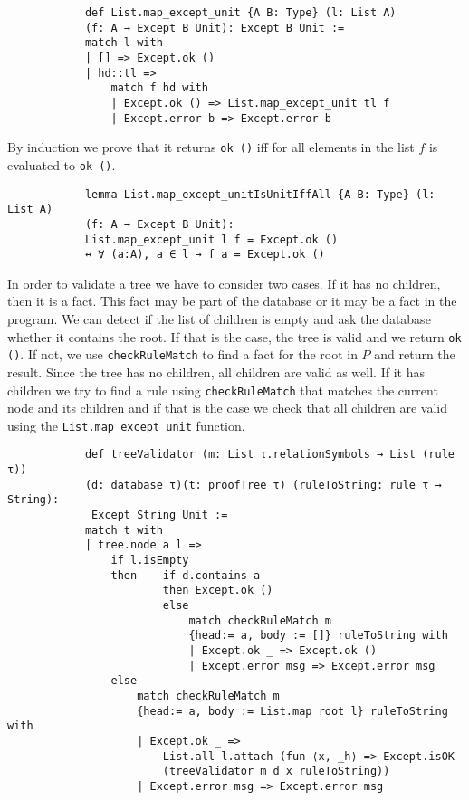 \documentclass{article}
\begin{document}
        \begin{lstlisting}
            def List.map_except_unit {A B: Type} (l: List A) 
            (f: A → Except B Unit): Except B Unit :=
            match l with
            | [] => Except.ok ()
            | hd::tl =>
                match f hd with
                | Except.ok () => List.map_except_unit tl f
                | Except.error b => Except.error b
        \end{lstlisting}

        By induction we prove that it returns \texttt{ok ()} iff for all elements in the list $f$ is evaluated to \texttt{ok ()}.

        \begin{lstlisting}
            lemma List.map_except_unitIsUnitIffAll {A B: Type} (l: List A) 
            (f: A → Except B Unit): 
            List.map_except_unit l f = Except.ok () 
            ↔ ∀ (a:A), a ∈ l → f a = Except.ok ()
        \end{lstlisting}

        In order to validate a tree we have to consider two cases. If it has no children, then it is a fact. This fact may be part of the database or it may be a fact in the program. We can detect if the list of children is empty and ask the database whether it contains the root. If that is the case, the tree is valid and we return \texttt{ok ()}. If not, we use \texttt{checkRuleMatch} to find a fact for the root in $P$ and return the result. Since the tree has no children, all children are valid as well.
        If it has children we try to find a rule using \texttt{checkRuleMatch} that matches the current node and its children and if that is the case we check that all children are valid using the \texttt{List.map\_except\_unit} function.

        \begin{lstlisting}
            def treeValidator (m: List τ.relationSymbols → List (rule τ)) 
            (d: database τ)(t: proofTree τ) (ruleToString: rule τ → String):
             Except String Unit :=
            match t with
            | tree.node a l =>
                if l.isEmpty
                then    if d.contains a
                        then Except.ok ()
                        else
                            match checkRuleMatch m 
                            {head:= a, body := []} ruleToString with
                            | Except.ok _ => Except.ok ()
                            | Except.error msg => Except.error msg
                else
                    match checkRuleMatch m 
                    {head:= a, body := List.map root l} ruleToString with
                    | Except.ok _ => 
                        List.all l.attach (fun ⟨x, _h⟩ => Except.isOK 
                        (treeValidator m d x ruleToString))
                    | Except.error msg => Except.error msg
        \end{lstlisting}
\end{document}
